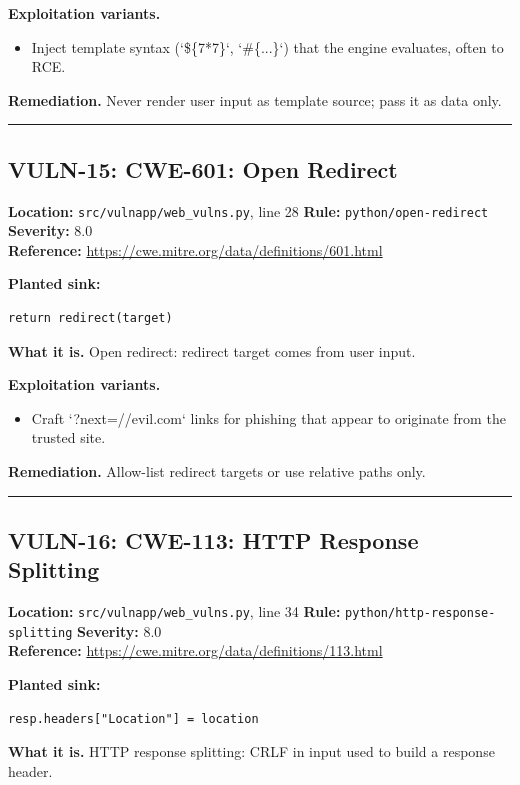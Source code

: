 \documentclass[11pt,a4paper]{article}
\begin{document}
\noindent\textbf{Exploitation variants.}
\begin{itemize}[leftmargin=1.4em,itemsep=1pt,topsep=2pt]
\item Inject template syntax (`\$\{7*7\}`, `\#\{...\}`) that the engine evaluates, often to RCE.
\end{itemize}
\noindent\textbf{Remediation.} Never render user input as template source; pass it as data only.

\vspace{4pt}\hrule\vspace{6pt}
\subsection{VULN-15: CWE-601: Open Redirect}
\noindent\textbf{Location:} \texttt{src/vulnapp/web\_vulns.py}, line 28 \quad \textbf{Rule:} \texttt{python/open-redirect} \quad \textbf{Severity:} 8.0
\\ \textbf{Reference:} \url{https://cwe.mitre.org/data/definitions/601.html}

\noindent\textbf{Planted sink:}
\begin{lstlisting}
return redirect(target)
\end{lstlisting}
\noindent\textbf{What it is.} Open redirect: redirect target comes from user input.

\noindent\textbf{Exploitation variants.}
\begin{itemize}[leftmargin=1.4em,itemsep=1pt,topsep=2pt]
\item Craft `?next=//evil.com` links for phishing that appear to originate from the trusted site.
\end{itemize}
\noindent\textbf{Remediation.} Allow-list redirect targets or use relative paths only.

\vspace{4pt}\hrule\vspace{6pt}
\subsection{VULN-16: CWE-113: HTTP Response Splitting}
\noindent\textbf{Location:} \texttt{src/vulnapp/web\_vulns.py}, line 34 \quad \textbf{Rule:} \texttt{python/http-response-splitting} \quad \textbf{Severity:} 8.0
\\ \textbf{Reference:} \url{https://cwe.mitre.org/data/definitions/113.html}

\noindent\textbf{Planted sink:}
\begin{lstlisting}
resp.headers["Location"] = location
\end{lstlisting}
\noindent\textbf{What it is.} HTTP response splitting: CRLF in input used to build a response header.
\end{document}
